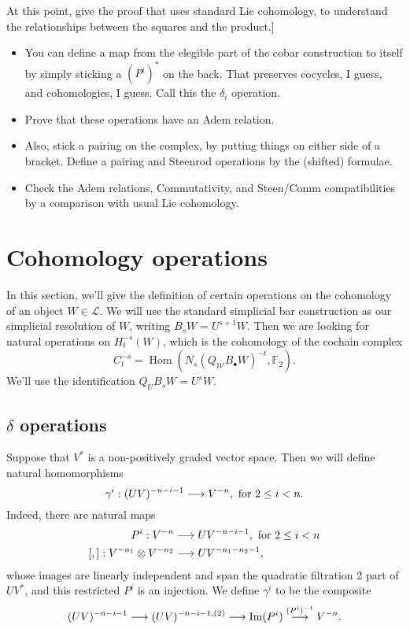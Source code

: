 \documentclass[11pt]{amsart}
\theoremstyle{plain}
\theoremstyle{definition}
\DeclareMathOperator{\Hom}{Hom}
\renewcommand{\to}{\longrightarrow}
\newcommand{\squishlist}{
  \setlength{\itemsep}{.5pt}
  \setlength{\parskip}{0pt}
  \setlength{\parsep}{0pt}}
\newcommand{\calW}{\mathcal{W}}
\newcommand{\calL}{\mathcal{L}}
\theoremstyle{plain}
\newcommand{\F}{\mathbb{F}}
\begin{document}
At this point, give the proof that uses standard Lie cohomology, to understand the relationships between the squares and the product.]
{\tiny\begin{itemize}\squishlist
\setlength{\parindent}{.25in}
\item You can define a map from the elegible part of the cobar construction to itself by simply sticking a $(P^i)^*$ on the back. That preserves cocycles, I guess, and cohomologies, I guess. Call this the $\delta_i$ operation.
\item Prove that these operations have an Adem relation.
\item Also, stick a pairing on the complex, by putting things on either side of a bracket. Define a pairing and Steenrod operations by the (shifted) formulae.
\item Check the Adem relations, Commutativity, and Steen/Comm compatibilities by a comparison with usual Lie cohomology.
\end{itemize}}



\section{Cohomology operations}
In this section, we'll give the definition of certain operations on the cohomology of an object $W\in\calL$. We will use the standard simplicial bar construction as our simplicial resolution of $W$, writing $B_sW=U^{s+1}W$. Then we are looking for natural operations on $H^{-s}_t(W)$, which is the cohomology of the cochain complex
\[C^{-s}_{t}=\Hom(N_s(Q_\calW B_{\bullet}W)^{-t},\F_2).\]
We'll use the identification $Q_UB_{s}W=U^{s}W$.

\subsection{$\delta$ operations}
Suppose that $V^{*}$ is a non-positively graded vector space. Then we will define natural homomorphisms
\[\gamma^i:(UV)^{-n-i-1}\to V^{-n}, \textup{ for $2\leq i<n$}.\]
Indeed, there are natural maps
\begin{align*}
P^i:V^{-n}&\to UV^{-n-i-1}, \textup{ for $2\leq i<n$}\\
[,]:V^{-n_1}\otimes V^{-n_2}&\to UV^{-n_1-n_2-1},
\end{align*}
whose images are linearly independent and span the quadratic filtration 2 part of $UV^*$, and this restricted $P^i$ is an injection. We define $\gamma^i$ to be the composite
\[(UV)^{-n-i-1}\to (UV)^{-n-i-1,(2)}\to \textup{Im}(P^i)\overset{(P^i)^{-1}}{\to}V^{-n}.\]
\end{document}
